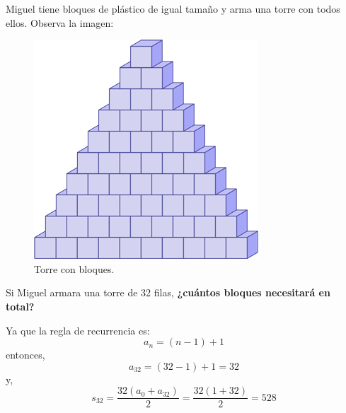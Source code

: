 Miguel tiene bloques de plástico de igual tamaño y arma una torre con todos ellos. Observa la imagen:

\begin{minipage}{0.4\linewidth}
    \begin{figure}[H]
        \centering
        \includegraphics[width=0.7\linewidth]{../images/22bc4d835622314209af99a305ea2515952e3902}
        \caption{Torre con bloques.}
        \label{fig:22bc4d835622314209af99a305ea2515952e3902}
    \end{figure}
\end{minipage}\hfill
\begin{minipage}{0.6\linewidth}
    Si Miguel armara una torre de 32 filas,
    \textbf{¿cuántos bloques necesitará en total?}\\
\end{minipage}

\begin{solutionbox}{4cm}
    Ya que la regla de recurrencia es:
    \[a_n=(n-1)+1\]
    entonces,
    \[a_{32}=(32-1)+1=32\]
    y,
    \[s_{32}=\dfrac{32(a_0+a_{32})}{2}=\dfrac{32(1+32)}{2}=528\]
\end{solutionbox}